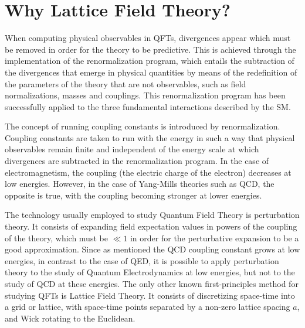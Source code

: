 \section*{Why Lattice Field Theory?}

When computing physical observables in QFTs, divergences appear which must be removed in order for the theory to be predictive. This is achieved through the implementation of the renormalization program, which entails the subtraction of the divergences that emerge in physical quantities by means of the redefinition of the parameters of the theory that are not observables, such as field normalizations, masses and couplings. This renormalization program has been successfully applied to the three fundamental interactions described by the SM.

The concept of running coupling constants is introduced by renormalization. Coupling constants are taken to run with the energy in such a way that physical observables remain finite and independent of the energy scale at which divergences are subtracted in the renormalization program.  In the case of electromagnetism, the coupling (the electric charge of the electron) decreases at low energies. However, in the case of Yang-Mills theories such as QCD, the opposite is true, with the coupling becoming stronger at lower energies. 

The technology usually employed to study Quantum Field Theory is perturbation theory. It consists of expanding field expectation values in powers of the coupling of the theory, which must be $\ll1$ in order for the perturbative expansion to be a good approximation. Since as mentioned the QCD coupling constant grows at low energies, in contrast to the case of QED, it is possible to apply perturbation theory to the study of Quantum Electrodynamics at low energies, but not to the study of QCD at these energies. The only other known first-principles method for studying QFTs is Lattice Field Theory. It consists of discretizing space-time into a grid or lattice, with space-time points separated by a non-zero lattice spacing $a$, and Wick rotating to the Euclidean. 


